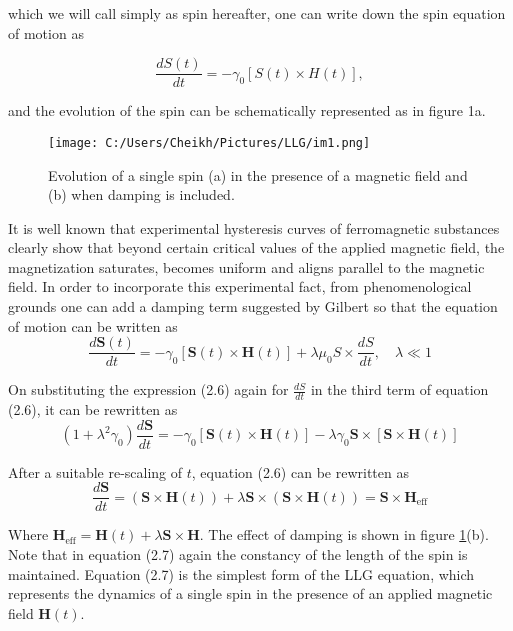 \documentclass{article}
\begin{document}
	
	which we will call simply as spin hereafter, one can write down the spin equation of motion as
	
	\begin{equation}
	\frac{dS(t)}{dt} = -\gamma_0 [S(t) \times H(t)],
	\end{equation}
	
	and the evolution of the spin can be schematically represented as in figure 1a.
	\begin{figure}[htbp]
		\centering
		\texttt{[image: C:/Users/Cheikh/Pictures/LLG/im1.png]}
		\caption{Evolution of a single spin (a) in the presence of a magnetic field and (b) when damping is included.}
		\label{fig:spin_evolution}
	\end{figure}

	It is well known that experimental hysteresis curves of ferromagnetic substances clearly show that beyond certain critical values of the applied magnetic field, the magnetization saturates, becomes uniform and aligns parallel to the magnetic field. In order to incorporate this experimental fact, from phenomenological grounds one can add a damping term suggested by Gilbert \cite{gilbert} so that the equation of motion can be written as
	\begin{equation}
	\frac{d\mathbf{S}(t)}{dt} = -\gamma_0[\mathbf{S}(t) \times \mathbf{H}(t)] + \lambda\mu_0 S \times \frac{dS}{dt}, \quad \lambda \ll 1
	\end{equation}
	
	On substituting the expression (2.6) again for $\frac{dS}{dt}$ in the third term of equation (2.6), it can be rewritten as
	\begin{equation}
	(1+\lambda^2\gamma_0)\frac{d\mathbf{S}}{dt} = -\gamma_0[\mathbf{S}(t) \times \mathbf{H}(t)] - \lambda \gamma_0 \mathbf{S} \times [\mathbf{S} \times \mathbf{H}(t)]
	\end{equation}
	
	After a suitable re-scaling of $t$, equation (2.6) can be rewritten as
	\begin{equation}
	\frac{d\mathbf{S}}{dt} = (\mathbf{S} \times \mathbf{H}(t)) + \lambda \mathbf{S} \times (\mathbf{S} \times \mathbf{H}(t)) = \mathbf{S} \times \mathbf{H}_{\text{eff}}
	\end{equation}
	
	Where $\mathbf{H}_{\text{eff}} = \mathbf{H}(t) + \lambda \mathbf{S} \times \mathbf{H}$. The effect of damping is shown in figure \ref{fig:spin_evolution}(b). Note that in equation (2.7) again the constancy of the length of the spin is maintained. Equation (2.7) is the simplest form of the LLG equation, which represents the dynamics of a single spin in the presence of an applied magnetic field $\mathbf{H}(t)$.
	
\end{document}
